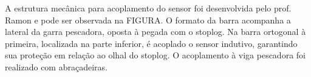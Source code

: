 A estrutura mecânica para acoplamento do sensor foi desenvolvida pelo prof.
Ramon e pode ser observada na FIGURA. O formato da barra acompanha a lateral
da garra pescadora, oposta à pegada com o stoplog. Na barra ortogonal à
primeira, localizada na parte inferior, é acoplado o sensor indutivo, garantindo
sua proteção em relação ao olhal do stoplog. O acoplamento à viga pescadora foi
realizado com abraçadeiras.




